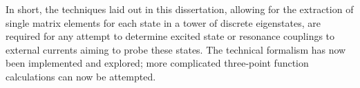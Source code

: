 In short, the techniques laid out in this dissertation, allowing for the extraction of single matrix elements for each state in a tower of discrete eigenstates, are required for any attempt to determine excited state or resonance couplings to external currents aiming to probe these states. The technical formalism has now been implemented and explored; more complicated three-point function calculations can now be attempted. 



